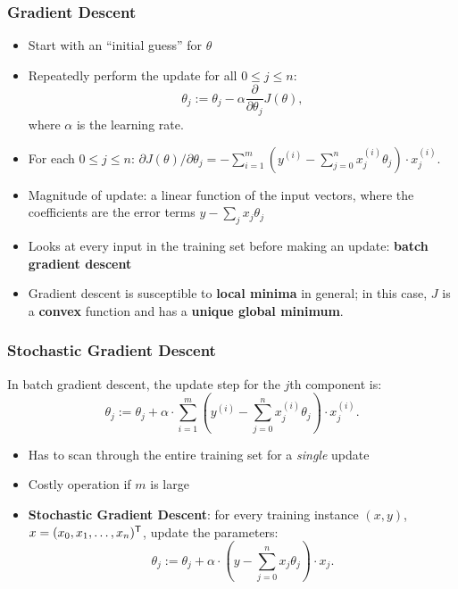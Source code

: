 \documentclass[xcolor=table]{beamer}
\newcommand{\trans}[1]{\ensuremath{#1}^{\scriptsize{\textsf{T}}}}
\begin{document}
\begin{frame}[t]
\frametitle{Gradient Descent}
\begin{itemize}
    \item Start with an ``initial guess'' for $\theta$

    \pause

    \item Repeatedly perform the update for all $0 \leq j \leq n$:
    \[
        \theta_j := \theta_j - \alpha \frac{\partial}{\partial \theta_j} J(\theta),
    \]
    where $\alpha$ is the learning rate.

    \pause 

    \item For each $0 \leq j \leq n$:
    $
        \partial J(\theta)/ \partial \theta_j = - \sum_{i = 1}^m 
        \left ( y^{(i)} - \sum_{j = 0}^n x_j^{(i)} \theta_j \right ) \cdot x_j^{(i)}.
    $
    
    \pause

    \item Magnitude of update: a linear function of the input vectors, where the
    coefficients are the error terms $y - \sum_j x_j \theta_j$

    \pause

    \item Looks at every input in the training set before making an update: \pause
    \textbf{batch gradient descent}
    
    \pause

    \item Gradient descent is susceptible to \textbf{local minima} in general; in
    this case, $J$ is a \textbf{convex} function and has a \textbf{unique global
    minimum}.  
\end{itemize}
\end{frame}

\begin{frame}[t]
\frametitle{Stochastic Gradient Descent}
In batch gradient descent, the update step for the $j$th component is:
\[
    \theta_j := \theta_j  + \alpha \cdot \sum_{i = 1}^m 
        \left ( y^{(i)} - \sum_{j = 0}^n x_j^{(i)} \theta_j \right ) \cdot x_j^{(i)}.
\]

\begin{itemize}
    \item Has to scan through the entire training set for a \emph{single} update
    
    \item Costly operation if $m$ is large
    
    \pause

    \item \textbf{Stochastic Gradient Descent}: for every training instance $(x, y)$, 
    $x = \trans{(x_0, x_1, \ldots, x_n)}$, update the parameters:
    \[
         \theta_j := \theta_j  + \alpha \cdot \left ( y - \sum_{j = 0}^n x_j 
         \theta_j \right ) \cdot x_j.
    \]
\end{itemize}
\end{frame}
\end{document}

